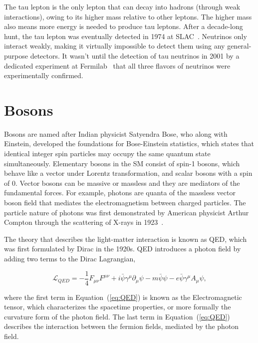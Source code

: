 The tau lepton is the only lepton that can decay into hadrons (through weak interactions), owing to its higher mass relative to other leptons. The higher mass also means more energy is needed to produce tau leptons. After a decade-long hunt, the tau lepton was eventually detected in 1974 at SLAC~\cite{Perl:1975bf}. Neutrinos only interact weakly, making it virtually impossible to detect them using any general-purpose detectors. It wasn't until the detection of tau neutrinos in 2001 by a dedicated experiment at Fermilab~\cite{DONUT:2000fbd} that all three flavors of neutrinos were experimentally confirmed. 

\section{Bosons}
\label{sec:Boson}

Bosons are named after Indian physicist Satyendra Bose, who along with Einstein, developed the foundations for Bose-Einstein statistics, which states that identical integer spin particles may occupy the same quantum state simultaneously. Elementary bosons in the \ac{SM} consist of spin-1 bosons, which behave like a vector under Lorentz transformation, and scalar bosons with a spin of 0. Vector bosons can be massive or massless and they are mediators of the fundamental forces. For example, photons are quanta of the massless vector boson field that mediates the electromagnetism between charged particles. The particle nature of photons was first demonstrated by American physicist Arthur Compton through the scattering of X-rays in 1923~\cite{PhysRev.21.483}.

The theory that describes the light-matter interaction is known as \ac{QED}, which was first formulated by Dirac in the 1920s. \ac{QED} introduces a photon field by adding two terms to the Dirac Lagrangian,

\begin{equation}
\label{eq:QED}
\mathcal{L}_{QED}=-\frac{1}{4}F_{\mu\nu}F^{\mu\nu}+i\bar{\psi}\gamma^{\mu}\partial_{\mu}\psi-m\bar{\psi}\psi-e\bar{\psi}\gamma^{\mu}A_{\mu}\psi,
\end{equation}

where the first term in Equation~(\ref{eq:QED}) is known as the Electromagnetic tensor, which characterizes the spacetime properties, or more formally the curvature form of the photon field. The last term in Equation~(\ref{eq:QED}) describes the interaction between the fermion fields, mediated by the photon field. 

